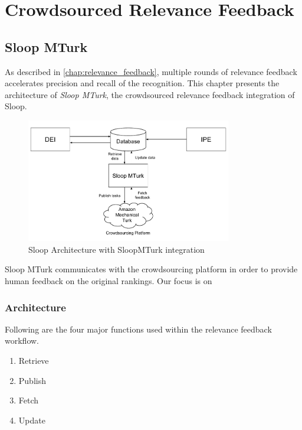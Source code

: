 \graphicspath{{./images/chap5/}}
\chapter{Crowdsourced Relevance Feedback}
\label{chap:sloop_mturk}
\section{Sloop MTurk}

As described in \ref{chap:relevance_feedback}, multiple rounds of relevance
feedback accelerates precision and recall of the recognition. This chapter
presents the architecture of \emph{Sloop MTurk}, the crowdsourced relevance
feedback integration of Sloop. 

\begin{figure}[h]
  \centering
  \includegraphics[width=0.8\textwidth]{sloop/turk_system}
  \caption{Sloop Architecture with SloopMTurk integration}
  \label{fig:turk_overview}
\end{figure}

Sloop MTurk communicates with the crowdsourcing platform in order to provide
human feedback on the original rankings. Our focus is on 

\subsection{Architecture}

Following are the four major functions used within the relevance feedback
workflow.
\begin{enumerate}
	\item Retrieve
	\item Publish
	\item Fetch
	\item Update
\end{enumerate}

